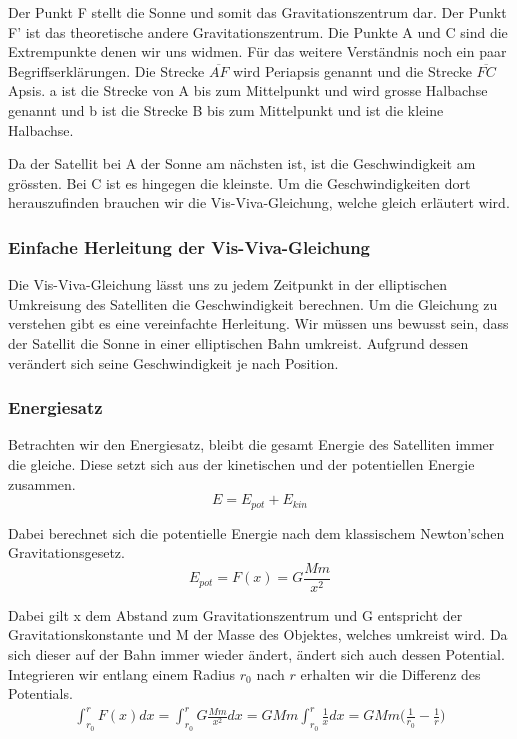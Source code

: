 \begin{refsection}
\noindent{}Der Punkt F stellt die Sonne und somit das Gravitationszentrum dar. Der Punkt F' ist das theoretische andere Gravitationszentrum. Die Punkte A und C sind die Extrempunkte denen wir uns widmen. Für das weitere Verständnis noch ein paar Begriffserklärungen. Die Strecke $\overline{AF}$ wird Periapsis genannt und die Strecke $\overline{FC}$ Apsis. a ist die Strecke von A bis zum Mittelpunkt und wird grosse Halbachse genannt und b ist die Strecke B bis zum Mittelpunkt und ist die kleine Halbachse.

Da der Satellit bei A der Sonne am nächsten ist, ist die Geschwindigkeit am grössten. Bei C ist es hingegen die kleinste. Um die Geschwindigkeiten dort herauszufinden brauchen wir die Vis-Viva-Gleichung, welche gleich erläutert wird.

\subsubsection{Einfache Herleitung der Vis-Viva-Gleichung}
Die Vis-Viva-Gleichung lässt uns zu jedem Zeitpunkt in der elliptischen Umkreisung des Satelliten die Geschwindigkeit berechnen. Um die Gleichung zu verstehen gibt es eine vereinfachte Herleitung. Wir müssen uns bewusst sein, dass der Satellit die Sonne in einer elliptischen Bahn umkreist. Aufgrund dessen verändert sich seine Geschwindigkeit je nach Position. 

\subsubsection{Energiesatz}
Betrachten wir den Energiesatz, bleibt die gesamt Energie des Satelliten immer die gleiche. Diese setzt sich aus der kinetischen und der potentiellen Energie zusammen.
\begin{equation}
E = E_{pot} + E_{kin}
\end{equation}

\noindent{}Dabei berechnet sich die potentielle Energie nach dem klassischem Newton'schen Gravitationsgesetz.
\begin{equation}
E_{pot} = F(x) = G\frac{Mm}{x^2}
\end{equation}

\noindent{}Dabei gilt x dem Abstand zum Gravitationszentrum und G entspricht der Gravitationskonstante und M der Masse des Objektes, welches umkreist wird. Da sich dieser auf der Bahn immer wieder ändert, ändert sich auch dessen Potential. Integrieren wir entlang einem Radius $r_0$ nach $r$ erhalten wir die Differenz des Potentials. 
\begin{align*}
\int_{r_0}^{r} F(x) dx= \int_{r_0}^{r} G\frac{Mm}{x^2} dx = GMm \int_{r_0}^{r} \frac{1}{x} dx = GMm \biggr( \frac{1}{r_0} - \frac{1}{r}\biggr)
\end{align*}


\end{refsection}
